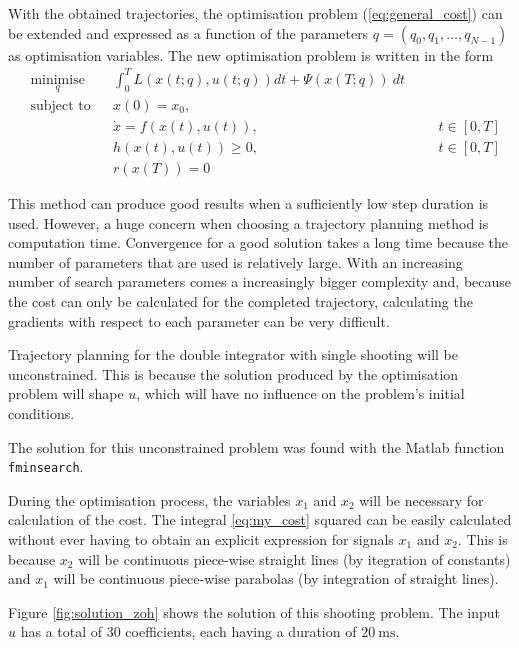 \par With the obtained trajectories, the optimisation problem (\ref{eq:general_cost}) can be extended and expressed as a function of the parameters $q=(q_0,q_1,\dots,q_{N-1})$ as optimisation variables. The new optimisation problem is written in the form  
\begin{equation}
    \begin{aligned}
    & \underset{q}{\text{minimise}} && \int_0^T L(x(t;q),u(t;q))dt + \Psi (x(T;q)) \ dt \\
    & \text{subject to}  && x(0) = x_0, \\
        & && \dot{x} = f(x(t), u(t)), &&& t \in [0,T]  \\
        & && h(x(t),u(t)) \geq 0, &&&  t \in [0,T]  \\
        & && r(x(T)) = 0
    \end{aligned}
    \label{eq:cost_zoh}
\end{equation}

\par This method can produce good results when a sufficiently low step duration is used. However, a huge concern when choosing a trajectory planning method is computation time. Convergence for a good solution takes a long time because the number of parameters that are used is relatively large. With an increasing number of search parameters comes a increasingly bigger complexity and, because the cost can only be calculated for the completed trajectory, calculating the gradients with respect to each parameter can be very difficult.

\par Trajectory planning for the double integrator with single shooting will be unconstrained. This is because the solution produced by the optimisation problem will shape $u$, which will have no influence on the problem's initial conditions. 
\par The solution for this unconstrained problem was found with the Matlab function \texttt{fminsearch}.
\par During the optimisation process, the variables $x_1$ and $x_2$ will be necessary for calculation of the cost. The integral \ref{eq:my_cost} squared  can be easily calculated without ever having to obtain an explicit expression for signals $x_1$ and $x_2$. This is because $x_2$ will be continuous piece-wise straight lines (by itegration of constants) and $x_1$ will be continuous piece-wise parabolas (by integration of straight lines).

\par Figure \ref{fig:solution_zoh} shows the solution of this shooting problem. The input $u$ has a total of 30 coefficients, each having a duration of $\SI{20}{\milli\second}$.

